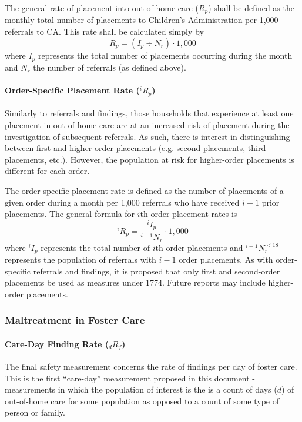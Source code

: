 \documentclass[12pt]{article}\usepackage[]{graphicx}\usepackage[]{color}
\begin{document}
The general rate of placement into out-of-home care ($R_p$) shall be defined as the monthly total number of placements to Children's Administration per 1,000 referrals to CA. This rate shall be calculated simply by 
\begin{equation}\label{eq:IRP}
R_p = (I_p \div N_r) \cdot 1,000
\end{equation}
where $I_p$ represents the total number of placements occurring during the month and $N_r$ the number of referrals (as defined above). 

\paragraph{Order-Specific Placement Rate (${}^iR_p$)}

Similarly to referrals and findings, those households that experience at least one placement in out-of-home care are at an increased risk of placement during the investigation of subsequent referrals. As such, there is interest in distinguishing between first and higher order placements (e.g. second placements, third placements, etc.). However, the population at risk for higher-order placements is different for each order.

The order-specific placement rate is defined as the number of placements of a given order during a month per 1,000 referrals who have received $i-1$ prior placements. The general formula for $i$th order placement rates is 
\begin{equation}\label{eq:iRf}
{}^iR_p = \frac{{}^iI_p} {{}^{i-1}N_{r}} \cdot 1,000
\end{equation}
where ${}^iI_p$ represents the total number of $i$th order placements and ${}^{i-1}N_{r}^{<18}$ represents the population of referrals with $i-1$ order placements. As with order-specific referrals and findings, it is proposed that only first and second-order placements be used as measures under 1774. Future reports may include higher-order placements. 

\subsubsection{Maltreatment in Foster Care}

\paragraph{Care-Day Finding Rate (${}_{d}R_f$)}

The final safety measurement concerns the rate of findings per day of foster care. This is the first ``care-day'' measurement proposed in this document - measurements in which the population of interest is the is a count of days ($d$) of out-of-home care for some population as opposed to a count of some type of person or family.
\end{document}

